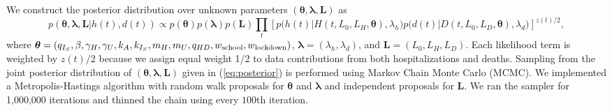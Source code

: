 \documentclass[11pt]{article}
\newcommand{\bL}{\mathbf{L}}
\newcommand{\btheta}{\boldsymbol{\theta}}
\newcommand{\blambda}{\boldsymbol{\lambda}}
\newcommand{\comments}[1]{[\textcolor{red}{#1}]}
\begin{document}


We construct the posterior distribution over unknown parameters $(\btheta, \blambda, \bL)$ as 
\begin{equation}
p(\btheta, \blambda, \bL | h(t), d(t)) \propto p(\btheta) p(\blambda) p(\bL)
							 \prod_t \left[ p\big(h(t)| H(t, L_0, L_H, \btheta), \lambda_h \big)
							         p\big(d(t)| D(t, L_0, L_D, \btheta), \lambda_d \big) \right]^{z(t)/2},
\label{eq:posterior}
\end{equation}
where $\btheta = (q_{I_S}, \beta, \gamma_H, \gamma_U, k_A, k_{I_S}, m_H, m_U, q_{HD}, w\textsubscript{school}, w\textsubscript{lockdown})$, $\blambda = (\lambda_h, \lambda_d)$, and $\bL = (L_0, L_H, L_D)$. Each likelihood term is weighted by $z(t)/2$ because we assign equal weight 1/2 to data contributions from both hospitalizations and deaths.  Sampling from the joint posterior distribution of $(\btheta, \blambda, \bL)$  given in (\ref{eq:posterior}) is performed using Markov Chain Monte Carlo (MCMC). We implemented a Metropolis-Hastings algorithm with random walk proposals for $\btheta$ and $\blambda$ and independent proposals for $\bL$. We ran the sampler for 1,000,000 iterations and thinned the chain using every $100$th iteration.
\end{document}
